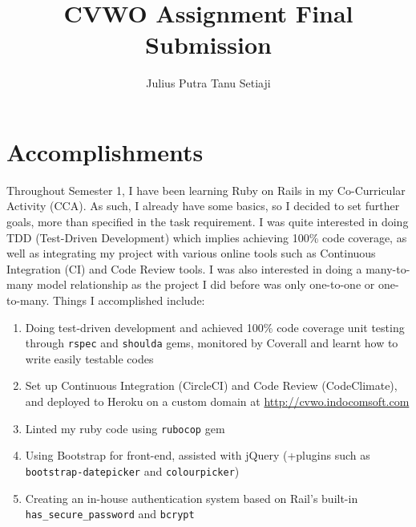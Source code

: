 \documentclass[12pt, a4paper]{article}
\title{CVWO Assignment Final Submission}
\author{Julius Putra Tanu Setiaji}
\begin{document}
	\maketitle
	\section{Accomplishments}
		Throughout Semester 1, I have been learning Ruby on Rails in my Co-Curricular Activity (CCA). As such, I already have some basics, so I decided to set further goals, more than specified in the task requirement. I was quite interested in doing TDD (Test-Driven Development) which implies achieving 100\% code coverage, as well as integrating my project with various online tools such as Continuous Integration (CI) and Code Review tools. I was also interested in doing a many-to-many model relationship as the project I did before was only one-to-one or one-to-many. Things I accomplished include:
		\begin{enumerate}
			\item Doing test-driven development and achieved 100\% code coverage unit testing through \texttt{rspec} and \texttt{shoulda} gems, monitored by Coverall and learnt how to write easily testable codes
			\item Set up Continuous Integration (CircleCI) and Code Review (CodeClimate), and deployed to Heroku on a custom domain at \url{http://cvwo.indocomsoft.com}
			\item Linted my ruby code using \texttt{rubocop} gem
			\item Using Bootstrap for front-end, assisted with jQuery (+plugins such as \texttt{bootstrap-datepicker} and \texttt{colourpicker})
			\item Creating an in-house authentication system based on Rail's built-in \texttt{has\_secure\_password} and \texttt{bcrypt}
		\end{enumerate}
\end{document}
